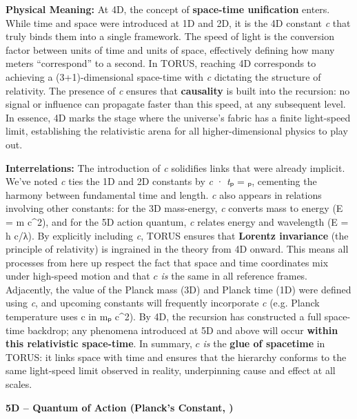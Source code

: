 \documentclass[
]{article}
\begin{document}
{\textbf{Physical Meaning:} At 4D, the concept of \textbf{space-time
unification} enters. While time and space were introduced at 1D and 2D,
it is the 4D constant \emph{c} that truly binds them into a single
framework. The speed of light is the conversion factor between units of
time and units of space\hspace{0pt}, effectively defining how many
meters ``correspond'' to a second. In TORUS, reaching 4D corresponds to
achieving a (3+1)-dimensional space-time with \emph{c} dictating the
structure of relativity. The presence of \emph{c} ensures that
\textbf{causality} is built into the recursion: no signal or influence
can propagate faster than this speed, at any subsequent
level\hspace{0pt}. In essence, 4D marks the stage where the universe's
fabric has a finite light-speed limit, establishing the relativistic
arena for all higher-dimensional physics to play out.

\textbf{Interrelations:} The introduction of \emph{c} solidifies links
that were already implicit. We've noted \emph{c} ties the 1D and 2D
constants by \emph{c} · \emph{t}ₚ = \emph{\ell}ₚ\hspace{0pt}, cementing the
harmony between fundamental time and length. \emph{c} also appears in
relations involving other constants: for the 3D mass-energy, \emph{c}
converts mass to energy (E = m c\^{}2), and for the 5D action quantum,
\emph{c} relates energy and wavelength (E = h c/λ)\hspace{0pt}. By
explicitly including \emph{c}, TORUS ensures that \textbf{Lorentz
invariance} (the principle of relativity) is ingrained in the theory
from 4D onward. This means all processes from here up respect the fact
that space and time coordinates mix under high-speed motion and that
\emph{$c$ is} the same in all reference frames. Adjacently, the value of
the Planck mass (3D) and Planck time (1D) were defined using \emph{c},
and upcoming constants will frequently incorporate \emph{c} (e.g. Planck
temperature uses c in mₚ c\^{}2). By 4D, the recursion has constructed a
full space-time backdrop; any phenomena introduced at 5D and above will
occur \textbf{within this relativistic space-time}\hspace{0pt}. In
summary, \emph{$c$ is} the \textbf{glue of spacetime} in TORUS: it links
space with time and ensures that the hierarchy conforms to the same
light-speed limit observed in reality, underpinning cause and effect at
all scales.

\textbf{5D -- Quantum of Action (Planck's Constant, \hbar)}

}
\end{document}
